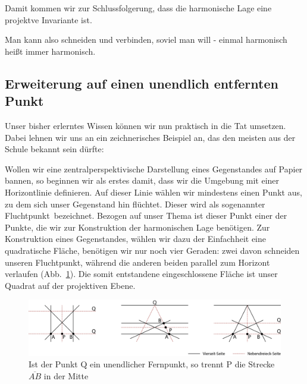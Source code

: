 \documentclass[12pt,a4paper]{article}
\begin{document}
Damit kommen wir zur Schlussfolgerung, dass die harmonische Lage eine projektve Invariante ist.

\glqq Man kann also schneiden und verbinden, soviel man will - einmal harmonisch heißt immer harmonisch.~\citep[s.~][S.~49]{projektiveGeometrie}\grqq

\newpage
\subsection{Erweiterung auf einen unendlich entfernten Punkt}

Unser bisher erlerntes Wissen können wir nun praktisch in die Tat umsetzen. Dabei lehnen wir uns an ein zeichnerisches Beispiel an, das den meisten aus der Schule bekannt sein dürfte:

Wollen wir eine zentralperspektivische Darstellung eines Gegenstandes auf Papier bannen, so beginnen wir als erstes damit, dass wir die Umgebung mit einer Horizontlinie definieren. Auf dieser Linie wählen wir mindestens einen Punkt aus, zu dem sich unser Gegenstand hin \glqq flüchtet\grqq . Dieser wird als sogenannter \glqq Fluchtpunkt\grqq ~bezeichnet. Bezogen auf unser Thema ist dieser Punkt einer der Punkte, die wir zur Konstruktion der harmonischen Lage benötigen. Zur Konstruktion eines Gegenstandes, wählen wir dazu der Einfachheit eine quadratische Fläche, benötigen wir nur noch vier Geraden: zwei davon schneiden unseren Fluchtpunkt, während die anderen beiden parallel zum Horizont verlaufen (Abb.~\ref{fig:inftyPoint}). Die somit entstandene eingeschlossene Fläche ist unser Quadrat auf der projektiven Ebene.

\begin{figure}[htbp]
\centering
\includegraphics[width=\textwidth]{Bilder/inftyPoint.png}
\caption{Ist der Punkt Q ein unendlicher Fernpunkt, so trennt P die Strecke $\overline{A B}$ in der Mitte}
\label{fig:inftyPoint}
\end{figure}
\end{document}
